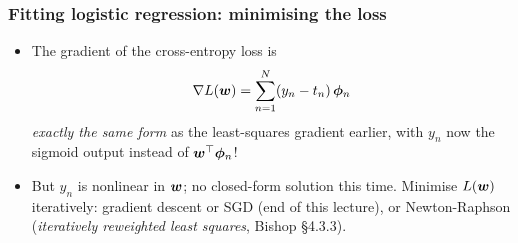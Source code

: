 \documentclass[10pt]{beamer}
\begin{document}
\begin{frame}[fragile]
\frametitle{Fitting logistic regression: minimising the loss}

\begin{itemize}
\item The gradient of the cross-entropy loss is
\[
\nabla L(\boldsymbol{w}) = \sum_{n=1}^{N} (y_n - t_n)\, \boldsymbol\phi_n
\]
\emph{exactly the same form} as the least-squares gradient earlier,
with $y_n$ now the sigmoid output instead of $\boldsymbol{w}^\top\boldsymbol\phi_n$!
\end{itemize}

\vspace{6pt}
\begin{itemize}
\item[$\Rightarrow$] But $y_n$ is nonlinear in $\boldsymbol{w}$; no closed-form
  solution this time. Minimise $L(\boldsymbol{w})$ iteratively: gradient descent
  or SGD (end of this lecture), or Newton-Raphson (\emph{iteratively reweighted least
  squares}, Bishop \S4.3.3).
\end{itemize}

\end{frame}

\end{document}
